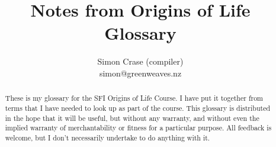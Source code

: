 \documentclass[]{article}
\title{
	Notes from Origins of Life\\
	Glossary
}
\author{Simon Crase (compiler) \\simon@greenweaves.nz}
\begin{document}
	\maketitle

\begin{abstract}
	These is my glossary for the SFI Origins of Life Course. I have put it together from terms that I have needed to look up as part of the course.
	This glossary is distributed in the hope that it will be useful,
	but without any warranty, and without even the implied warranty of
	merchantability or fitness for a particular purpose. All feedback is welcome,
	but I don't necessarily undertake to do anything with it.
\end{abstract}
	
	\glsaddall
	\printglossaries
	
	
	
	
\end{document}
